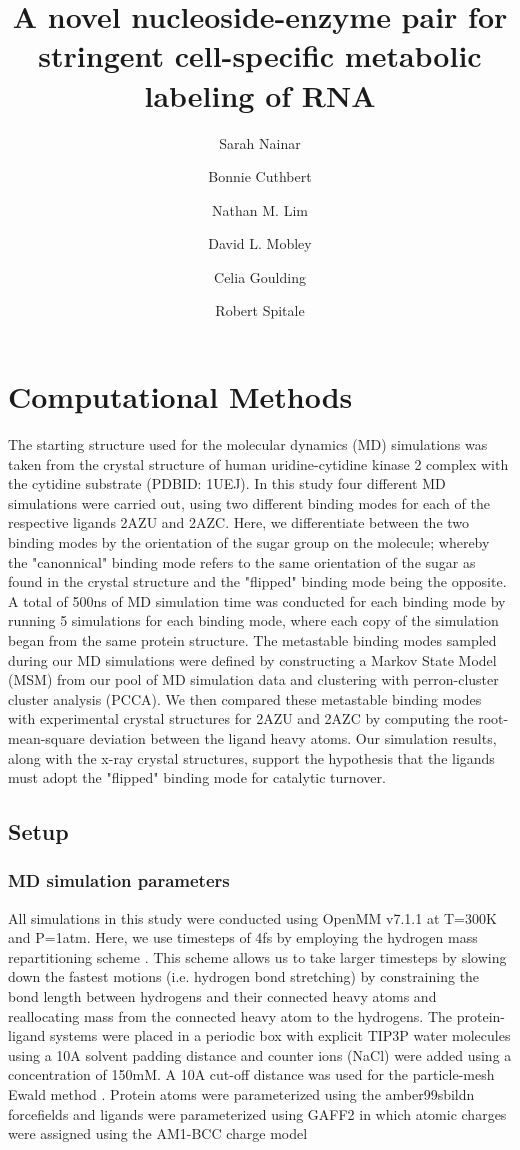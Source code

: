 \documentclass[fleqn,10pt]{wlscirep}
\title{A novel nucleoside-enzyme pair for stringent cell-specific metabolic labeling of RNA}
\author[1]{Sarah Nainar}
\author[1]{Bonnie Cuthbert}
\author[1]{Nathan M. Lim}
\author[1]{David L. Mobley}
\author[1]{Celia Goulding}
\author[1, *]{Robert Spitale}
\affil[1]{Department of Pharmaceutical Sciences, University of California---Irvine, Irvine, California 92697, United States}
\affil[*]{rspitale@uci.edu}
\begin{document}
\flushbottom
\maketitle
\tableofcontents

\section{Computational Methods}
The starting structure used for the molecular dynamics (MD) simulations was taken from the crystal structure of human uridine-cytidine kinase 2 complex with the cytidine substrate (PDBID: 1UEJ).
In this study four different MD simulations were carried out, using two different binding modes for each of the respective ligands 2AZU and 2AZC.
Here, we differentiate between the two binding modes by the orientation of the sugar group on the molecule; whereby the "canonnical" binding mode refers to the same orientation of the sugar as found in the crystal structure and the "flipped" binding mode being the opposite.
A total of 500ns of MD simulation time was conducted for each binding mode by running 5 simulations for each binding mode, where each copy of the simulation began from the same protein structure.
The metastable binding modes sampled during our MD simulations were defined by constructing a Markov State Model (MSM) from our pool of MD simulation data and clustering with perron-cluster cluster analysis (PCCA).
We then compared these metastable binding modes with experimental crystal structures for 2AZU and 2AZC by computing the root-mean-square deviation between the ligand heavy atoms.
Our simulation results, along with the x-ray crystal structures, support the hypothesis that the ligands must adopt the "flipped" binding mode for catalytic turnover. 

\subsection{Setup}
\subsubsection{MD simulation parameters}
All simulations in this study were conducted using OpenMM v7.1.1 \cite{openmm} at T=300K and P=1atm.
Here, we use timesteps of 4fs by employing the hydrogen mass repartitioning scheme \cite{hmr}. 
This scheme allows us to take larger timesteps by slowing down the fastest motions (i.e. hydrogen bond stretching) by constraining the bond length between hydrogens and their connected heavy atoms and reallocating mass from the connected heavy atom to the hydrogens.
The protein-ligand systems were placed in a periodic box with explicit TIP3P water molecules using a 10A solvent padding distance and counter ions (NaCl) were added using a concentration of 150mM.
A 10A cut-off distance was used for the particle-mesh Ewald method \cite{}.
Protein atoms were parameterized using the amber99sbildn forcefields \cite{} and ligands were parameterized using GAFF2 \cite{} in which atomic charges were assigned using the AM1-BCC charge model \cite{}
\end{document}
